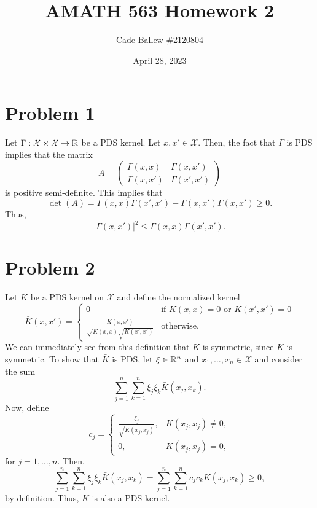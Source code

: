\documentclass{article}
\title{AMATH 563 Homework 2}
\author{Cade Ballew \#2120804}
\date{April 28, 2023}
\begin{document}
	
\maketitle
	
\section{Problem 1}
Let $\Gamma:\mathcal{X}\times\mathcal{X}\to\mathbb{R}$ be a PDS kernel. Let $x,x'\in\mathcal{X}$. Then, the fact that $\Gamma$ is PDS implies that the matrix 
\[
A=\begin{pmatrix}
\Gamma(x,x)&\Gamma(x,x')\\
\Gamma(x,x')&\Gamma(x',x')
\end{pmatrix}
\]
is positive semi-definite. This implies that 
\[
\det(A)=\Gamma(x,x)\Gamma(x',x')-\Gamma(x,x')\Gamma(x,x')\geq0.
\]
Thus,
\[
|\Gamma(x,x')|^2\leq\Gamma(x,x)\Gamma(x',x').
\]

\section{Problem 2}
Let $K$ be a PDS kernel on $\mathcal{X}$ and define the normalized kernel
\[
\bar K(x, x') =
\begin{cases}
	0 & \text{if } K(x, x) = 0 \text{ or } K(x', x') = 0 \\
	\frac{K(x, x')}{\sqrt{K(x, x)}\sqrt{K(x', x')}} & \text{otherwise}.
\end{cases}
\]
We can immediately see from this definition that $\bar K$ is symmetric, since $K$ is symmetric. To show that $\bar K$ is PDS, let $\xi\in\mathbb{R}^n$ and $x_1,\ldots,x_n\in\mathcal{X}$ and consider the sum
\[
\sum_{j=1}^{n}\sum_{k=1}^{n}\xi_j\xi_k\bar K(x_j,x_k).
\]
Now, define 
\[
c_j=\begin{cases}
	\frac{\xi_j}{\sqrt{K(x_j, x_j)}},&K(x_j, x_j)\neq0,\\
	0,&K(x_j, x_j)=0,
\end{cases}
\]
for $j=1,\ldots,n$. Then, 
\[
\sum_{j=1}^{n}\sum_{k=1}^{n}\xi_j\xi_k\bar K(x_j,x_k)=\sum_{j=1}^{n}\sum_{k=1}^{n}c_jc_kK(x_j,x_k)\geq0,
\]
by definition. Thus, $\bar K$ is also a PDS kernel.
\end{document}
